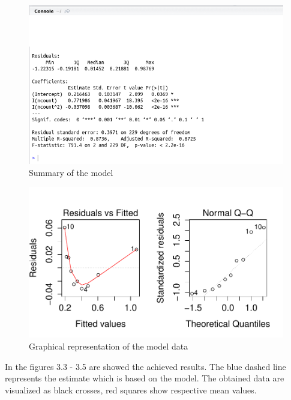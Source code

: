 \begin{figure}[h]
\begin{center}
\includegraphics[scale=0.65]{./img/model.png}
\caption{Summary of the model}
\end{center}
\end{figure}

\begin{figure}[h]
\begin{center}
\includegraphics[scale=0.85]{./img/modelplot.pdf}
\caption{Graphical representation of the model data}
\end{center}
\end{figure}

In the figures 3.3 - 3.5 are showed the achieved results. The blue
dashed line represents the estimate which is based on the model. The
obtained data are visualized as black crosses, red squares show
respective mean values.

